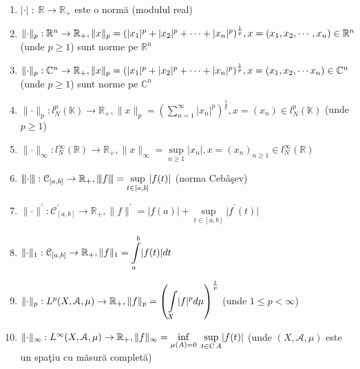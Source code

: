 \documentclass[ a4paper, 12pt]{report}
\theoremstyle{definition}
\theoremstyle{remark}
\numberwithin{equation}{section}
\begin{document}
\begin{enumerate}
\item $\lvert \cdot \lvert \;: \; \mathbb{R} \rightarrow \mathbb{R}_{+}$ este o norm\u a (modulul real)
\item $\lVert \cdot \rVert_p : \mathbb{R}^{n} \rightarrow \mathbb{R}_{+}, \lVert x \rVert_{p} = (\lvert x_1\rvert^{p} + \lvert x_2\rvert^{p} + \cdots + \lvert x_n\rvert^{p})^{\frac{1}{p}},\\
 x = (x_1,x_2, \cdots, x_n) \in \mathbb{R}^{n}$ (unde $p \geq 1$) sunt norme pe $\mathbb{R}^{n}$
\item $\lVert \cdot \rVert_p : \mathbb{C}^{n} \rightarrow \mathbb{R}_{+}, \lVert x \rVert_{p} = (\lvert x_1\rvert^{p} + \lvert x_2\rvert^{p} + \cdots + \lvert x_n\rvert^{p})^{\frac{1}{p}},\\
 x = (x_1,x_2, \cdots x_n) \in \mathbb{C}^{n}$ (unde $p \geq 1$) sunt norme pe $\mathbb{C}^{n}$
\item $\lVert \cdot \rVert_p : l_{N}^{p}(\mathbb{K}) \rightarrow \mathbb{R}_{+}, \lVert x \rVert_{p} = (\sum\limits_{n=1}^{\infty} \lvert x_n \rvert^p)^{\frac{1}{p}}, x = (x_n) \in l_{N}^{p}(\mathbb{K})$ (unde $p \geq 1$)
\item $\lVert \cdot \rVert_{\infty} : l_{N}^{\infty}(\mathbb{R}) \rightarrow \mathbb{R}_{+}, \lVert x \rVert_{\infty} = \sup\limits_{n \geq 1} \lvert x_n \rvert, x = (x_n)_{n \geq 1} \in l_{N}^{\infty}(\mathbb{R})$
\item ${\left\vert\kern-0.25ex\left\vert\kern-0.25ex\left\vert \cdot \right\vert\kern-0.25ex\right\vert\kern-0.25ex\right\vert} : \mathcal{C}_{[a,b]} \rightarrow \mathbb{R}_{+}, {\left\vert\kern-0.25ex\left\vert\kern-0.25ex\left\vert f \right\vert\kern-0.25ex\right\vert\kern-0.25ex\right\vert} = \sup\limits_{t \in [a,b]} \lvert f(t) \rvert$ (norma Ceb\^ a\c sev)
\item  $\lVert \cdot \rVert^{'} : \mathcal{C}^{'}_{[a,b]} \rightarrow \mathbb{R}_{+}, \lVert f \rVert^{'} = \lvert f(a) \rvert + \sup\limits_{t \in [a,b]} \lvert f^{'}(t) \rvert$
\item $\lVert \cdot \rVert_{1} : \mathcal{C}_{[a,b]} \rightarrow \mathbb{R}_{+}, \lVert f \rVert_{1} = \displaystyle\int\limits_a^b \lvert f(t) \rvert dt $
\item $\Vert \cdot \rVert_{p} : L^{p}(X,\mathcal{A},\mu) \rightarrow \mathbb{R}_{+}, \lVert f \rVert_{p} = \left (  \displaystyle\int\limits_{X}\lvert f \rvert^{p} d\mu \right )^{\frac{1}{p}}$ (unde $1 \leq p < \infty $)
\item $\lVert \cdot \rVert_{\infty} : L^{\infty}(X, \mathcal{A}, \mu) \rightarrow \mathbb{R}_{+}, \lVert f \rVert_{\infty} = \inf\limits_{\mu(A) = 0} \; \sup\limits_{t \in {\rm C}\, A} \lvert f(t) \rvert$ (unde $(X, \mathcal{A}, \mu)$ este un spa\c tiu cu m\u asur\u a complet\u a)
\end{enumerate}
\end{document}
